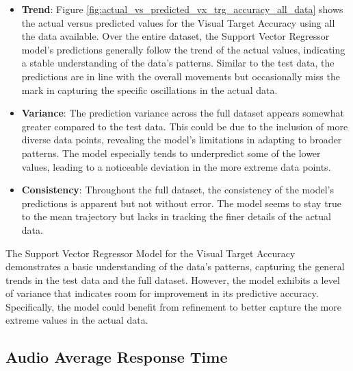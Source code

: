 \begin{itemize}
    \item \textbf{Trend}: Figure \ref{fig:actual_vs_predicted_vx_trg_accuracy_all_data} shows the actual versus predicted values for the Visual Target Accuracy using all the data available. Over the entire dataset,
          the Support Vector Regressor model's predictions generally follow the trend of the actual values, indicating a stable understanding of the data's patterns. Similar to the test data, the predictions are in line with the
          overall movements but occasionally miss the mark in capturing the specific oscillations in the actual data.

    \item \textbf{Variance}: The prediction variance across the full dataset appears somewhat greater compared to the test data. This could be due to the inclusion of more diverse data points, revealing the model's
          limitations in adapting to broader patterns. The model especially tends to underpredict some of the lower values, leading to a noticeable deviation in the more extreme data points.

    \item \textbf{Consistency}: Throughout the full dataset, the consistency of the model's predictions is apparent but not without error. The model seems to stay true to the mean trajectory but lacks in tracking the
          finer details of the actual data.

\end{itemize}

The Support Vector Regressor Model for the Visual Target Accuracy demonstrates a basic understanding of the data's patterns, capturing the general trends in the test data and the full dataset. However, the model exhibits
a level of variance that indicates room for improvement in its predictive accuracy. Specifically, the model could benefit from refinement to better capture the more extreme values in the actual data.

\subsection*{Audio Average Response Time}

